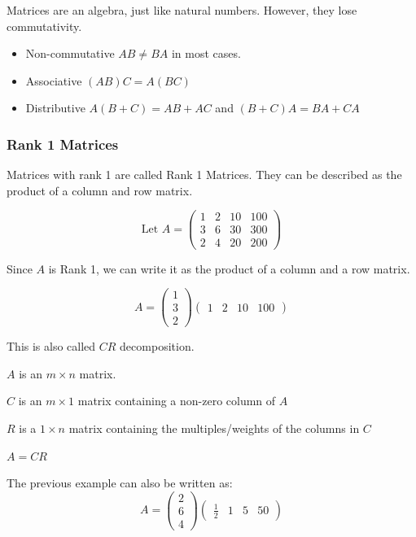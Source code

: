 Matrices are an algebra, just like natural numbers.
However, they lose commutativity.
\begin{itemize}
  \item Non-commutative
      $AB \neq BA$ in most cases. 
  \item Associative 
      $(AB)C = A(BC)$
  \item Distributive 
    $A(B+C) = AB+AC$ and $(B+C)A = BA+CA$
\end{itemize}

\newpage
\subsubsection{Rank 1 Matrices}
Matrices with rank 1 are called Rank 1 Matrices. They can be described as the product of a column and row matrix. 


\begin{example}
    
    \[
    \text{Let } A = \begin{pmatrix}
        1 & 2 & 10 & 100 \\ 3 & 6 & 30 & 300 \\ 2 & 4 & 20 & 200
    \end{pmatrix}
    \]

    Since $A$ is Rank 1, we can write it as the product of a column and a row matrix. 

    \[
        A = \begin{pmatrix}
          1 \\ 3 \\ 2 
        \end{pmatrix} \begin{pmatrix}
        1 & 2 & 10 & 100
        \end{pmatrix}
    \]
\end{example}

This is also called $CR$ decomposition.

\begin{definition}[CR Decomposition]
    $A$ is an $m \times n$ matrix.

    $C$ is an $m \times 1$ matrix containing a non-zero column of $A$

    $R$ is a $1 \times n$ matrix containing the multiples/weights of the columns in $C$

    $A = CR$ 
\end{definition}

\begin{example}
    The previous example can also be written as:
    \[
        A = \begin{pmatrix}
            2 \\ 6 \\ 4
        \end{pmatrix} \begin{pmatrix}
        \frac{1}{2} & 1 & 5 & 50
        \end{pmatrix}
    \]
    
\end{example}

